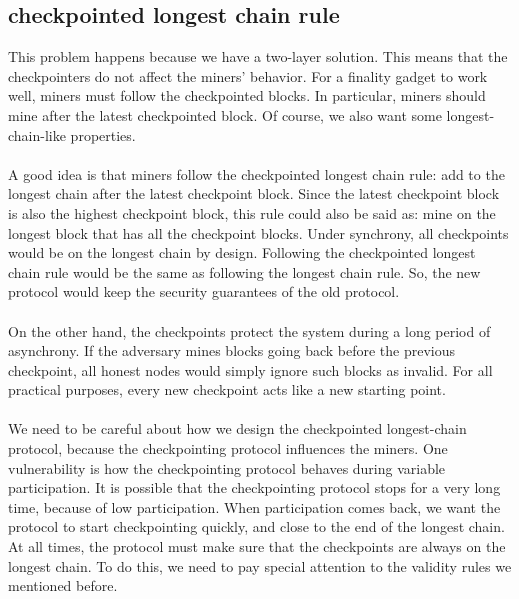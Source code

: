 	\subsection{checkpointed longest chain rule}
	This problem happens because we have a two-layer solution. This means that the checkpointers do not affect the miners’ behavior. For a finality gadget to work well, miners must follow the checkpointed blocks. In particular, miners should mine after the latest checkpointed block. Of course, we also want some longest-chain-like properties.\\\\
	A good idea is that miners follow the checkpointed longest chain rule: add to the longest chain after the latest checkpoint block. Since the latest checkpoint block is also the highest checkpoint block, this rule could also be said as: mine on the longest block that has all the checkpoint blocks. Under synchrony, all checkpoints would be on the longest chain by design. Following the checkpointed longest chain rule would be the same as following the longest chain rule. So, the new protocol would keep the security guarantees of the old protocol. \\\\
	On the other hand, the checkpoints protect the system during a long period of asynchrony. If the adversary mines blocks going back before the previous checkpoint, all honest nodes would simply ignore such blocks as invalid. For all practical purposes, every new checkpoint acts like a new starting point.\\\\
	We need to be careful about how we design the checkpointed longest-chain protocol, because the checkpointing protocol influences the miners. One vulnerability is how the checkpointing protocol behaves during variable participation. It is possible that the checkpointing protocol stops for a very long time, because of low participation. When participation comes back, we want the protocol to start checkpointing quickly, and close to the end of the longest chain. At all times, the protocol must make sure that the checkpoints are always on the longest chain. To do this, we need to pay special attention to the validity rules we mentioned before.